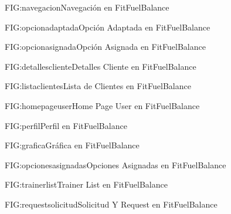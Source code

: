 \begin{figure}[Navegación]{FIG:navegacion}{Navegación en FitFuelBalance}
\end{figure}

\begin{figure}[Opción Adaptada]{FIG:opcionadaptada}{Opción Adaptada en FitFuelBalance}
\end{figure}

\begin{figure}[Opción Asignada]{FIG:opcionasignada}{Opción Asignada en FitFuelBalance}
\end{figure}

\begin{figure}[Detalles Cliente]{FIG:detallescliente}{Detalles Cliente en FitFuelBalance}
\end{figure}

\begin{figure}[Lista de Clientes]{FIG:listaclientes}{Lista de Clientes en FitFuelBalance}
\end{figure}

\begin{figure}[Home Page User]{FIG:homepageuser}{Home Page User en FitFuelBalance}
\end{figure}

\begin{figure}[Perfil]{FIG:perfil}{Perfil en FitFuelBalance}
\end{figure}

\begin{figure}[Gráfica]{FIG:grafica}{Gráfica en FitFuelBalance}
\end{figure}

\begin{figure}[Opciones Asignadas]{FIG:opcionesasignadas}{Opciones Asignadas en FitFuelBalance}
\end{figure}

\begin{figure}[Trainer List]{FIG:trainerlist}{Trainer List en FitFuelBalance}
\end{figure}

\begin{figure}[Solicitud y Request]{FIG:requestsolicitud}{Solicitud Y Request en FitFuelBalance}
\end{figure}

